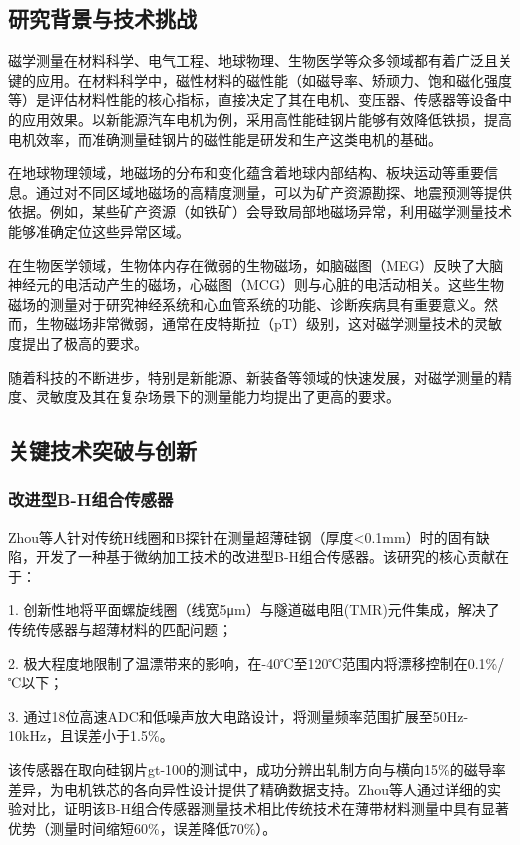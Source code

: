 \documentclass[lettersize,journal]{IEEEtran}
\begin{document}
	\subsection{研究背景与技术挑战}
	磁学测量在材料科学、电气工程、地球物理、生物医学等众多领域都有着广泛且关键的应用。在材料科学中，磁性材料的磁性能（如磁导率、矫顽力、饱和磁化强度等）是评估材料性能的核心指标，直接决定了其在电机、变压器、传感器等设备中的应用效果。以新能源汽车电机为例，采用高性能硅钢片能够有效降低铁损，提高电机效率，而准确测量硅钢片的磁性能是研发和生产这类电机的基础。
	
	在地球物理领域，地磁场的分布和变化蕴含着地球内部结构、板块运动等重要信息。通过对不同区域地磁场的高精度测量，可以为矿产资源勘探、地震预测等提供依据。例如，某些矿产资源（如铁矿）会导致局部地磁场异常，利用磁学测量技术能够准确定位这些异常区域。
	
	在生物医学领域，生物体内存在微弱的生物磁场，如脑磁图（MEG）反映了大脑神经元的电活动产生的磁场，心磁图（MCG）则与心脏的电活动相关。这些生物磁场的测量对于研究神经系统和心血管系统的功能、诊断疾病具有重要意义。然而，生物磁场非常微弱，通常在皮特斯拉（pT）级别，这对磁学测量技术的灵敏度提出了极高的要求。
	
	随着科技的不断进步，特别是新能源、新装备等领域的快速发展，对磁学测量的精度、灵敏度及其在复杂场景下的测量能力均提出了更高的要求。
	
	\subsection{关键技术突破与创新}
	
	\subsubsection{改进型B-H组合传感器}
	Zhou等人针对传统H线圈和B探针在测量超薄硅钢（厚度<0.1mm）时的固有缺陷，开发了一种基于微纳加工技术的改进型B-H组合传感器\cite{10530926}。该研究的核心贡献在于：
	
	1. 创新性地将平面螺旋线圈（线宽5μm）与隧道磁电阻(TMR)元件集成，解决了传统传感器与超薄材料的匹配问题；
	
	2. 极大程度地限制了温漂带来的影响，在-40℃至120℃范围内将漂移控制在0.1\%/℃以下；
	
	3. 通过18位高速ADC和低噪声放大电路设计，将测量频率范围扩展至50Hz-10kHz，且误差小于1.5\%。
	
	该传感器在取向硅钢片gt-100的测试中，成功分辨出轧制方向与横向15\%的磁导率差异，为电机铁芯的各向异性设计提供了精确数据支持。Zhou等人通过详细的实验对比，证明该B-H组合传感器测量技术相比传统技术在薄带材料测量中具有显著优势（测量时间缩短60\%，误差降低70\%）。
	
\end{document}
